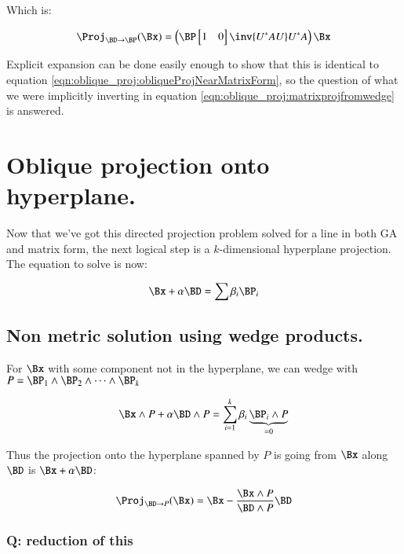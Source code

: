 Which is:

\begin{equation}
\Proj_{\BD \rightarrow \BP}(\Bx) = 
\left(
\BP
\begin{bmatrix}
1 & 0 \\
\end{bmatrix}
\inv{U^* A U 
}
U^*
A
\right)
\Bx
\end{equation}

Explicit expansion can be done easily enough to show that this is identical to equation \ref{eqn:oblique_proj:obliqueProjNearMatrixForm}, so
the question of what we were implicitly inverting in equation \ref{eqn:oblique_proj:matrixprojfromwedge} is answered.

\section{Oblique projection onto hyperplane. }

Now that we've got this directed projection problem solved for a line in both GA and matrix form, the next logical step is a $k$-dimensional hyperplane projection.  The equation to solve is now:

\begin{equation}\label{eqn:oblique_proj:solveForprojPlane}
\Bx + \alpha \BD = \sum \beta_i \BP_i
\end{equation}

\subsection{Non metric solution using wedge products. }

For $\Bx$ with some component not in the hyperplane, we can wedge with $P = \BP_1 \wedge \BP_2 \wedge \cdots \wedge \BP_k$

\begin{equation*}
\Bx \wedge P + \alpha \BD \wedge P = \sum_{i=1}^k \beta_i \underbrace{\BP_i \wedge P}_{=0}
\end{equation*}

Thus the projection onto the hyperplane spanned by $P$ is going from $\Bx$ along $\BD$ is $\Bx + \alpha \BD$:

\begin{equation}\label{eqn:oblique_proj:GAhyperplaneProjection}
\Proj_{\BD \rightarrow P}(\Bx) = \Bx - \frac{\Bx \wedge P}{\BD \wedge P} \BD
\end{equation}

\subsubsection{Q: reduction of this }

